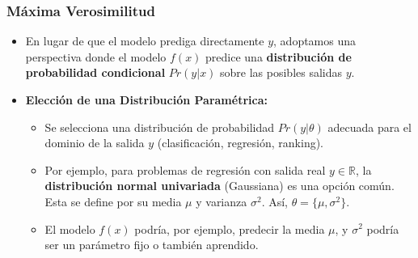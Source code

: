 \documentclass[aspectratio=169, 10pt]{beamer}
\begin{document}
\begin{frame}
	\frametitle{Máxima Verosimilitud}
	\begin{itemize}
		\item En lugar de que el modelo prediga directamente $y$, adoptamos una perspectiva donde el modelo $f(x)$ predice una \textbf{distribución de probabilidad condicional} \(Pr(y|x)\) sobre las posibles salidas $y$.
		\item \textbf{Elección de una Distribución Paramétrica:}
		\begin{itemize}
			\item Se selecciona una distribución de probabilidad \(Pr(y|\theta)\) adecuada para el dominio de la salida $y$ (clasificación, regresión, ranking).
			\item Por ejemplo, para problemas de regresión con salida real \(y \in \mathbb{R}\), la \textbf{distribución normal univariada} (Gaussiana) es una opción común. Esta se define por su media \(\mu\) y varianza \(\sigma^2\). Así, \(\theta = \{\mu, \sigma^2\}\).
			\item El modelo $f(x)$ podría, por ejemplo, predecir la media \(\mu\), y \(\sigma^2\) podría ser un parámetro fijo o también aprendido.
		\end{itemize}
	\end{itemize}
\end{frame}
\end{document}
